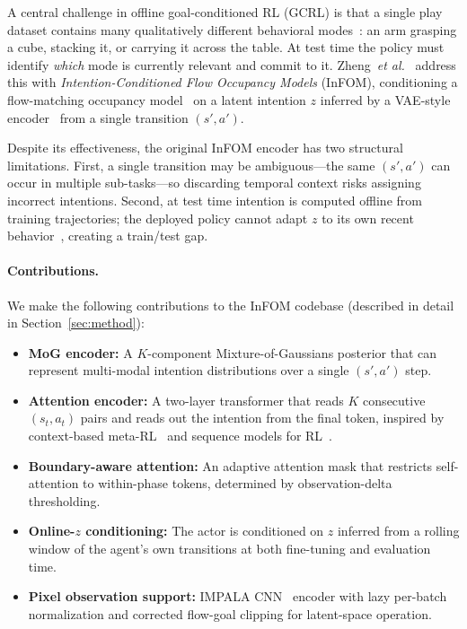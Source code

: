 \documentclass{article}
\newcommand{\etal}{\textit{et al.}}
\newcommand{\base}{InFOM}
\begin{document}
A central challenge in offline goal-conditioned RL (GCRL) is that a single
play dataset contains many qualitatively different behavioral
modes~\cite{park2025ogbench,ghosh2023passive}: an arm grasping a cube,
stacking it, or carrying it across the table.
At test time the policy must identify \emph{which} mode is currently
relevant and commit to it.
Zheng~\etal{}~\cite{zheng2025infom} address this with
\emph{Intention-Conditioned Flow Occupancy Models} (\base{}),
conditioning a flow-matching occupancy model~\cite{lipman2023flow,farebrother2025tdflows}
on a latent intention $z$ inferred by a VAE-style
encoder~\cite{kingma2013vae} from a single transition $(s',a')$.

Despite its effectiveness, the original \base{} encoder has two structural
limitations.
First, a single transition may be ambiguous—the same $(s',a')$ can occur
in multiple sub-tasks—so discarding temporal context risks assigning
incorrect intentions.
Second, at test time intention is computed offline from training
trajectories; the deployed policy cannot adapt $z$ to its own recent
behavior~\cite{rakelly2019pearl,duan2016rl2}, creating a train/test gap.

\paragraph{Contributions.}
We make the following contributions to the \base{} codebase
(described in detail in Section~\ref{sec:method}):
\begin{itemize}\setlength\itemsep{2pt}
    \item \textbf{MoG encoder:} A $K$-component Mixture-of-Gaussians
    posterior that can represent multi-modal intention distributions over
    a single $(s',a')$ step.

    \item \textbf{Attention encoder:} A two-layer transformer that reads
    $K$ consecutive $(s_t,a_t)$ pairs and reads out the intention from
    the final token, inspired by context-based
    meta-RL~\cite{rakelly2019pearl,duan2016rl2} and
    sequence models for RL~\cite{chen2021dt,reed2022gato}.

    \item \textbf{Boundary-aware attention:} An adaptive attention mask
    that restricts self-attention to within-phase tokens, determined by
    observation-delta thresholding.

    \item \textbf{Online-$z$ conditioning:} The actor is conditioned on
    $z$ inferred from a rolling window of the agent's own transitions at
    both fine-tuning and evaluation time.

    \item \textbf{Pixel observation support:} IMPALA
    CNN~\cite{espeholt2018impala} encoder with lazy per-batch
    normalization and corrected flow-goal clipping for latent-space
    operation.
\end{itemize}
\end{document}
